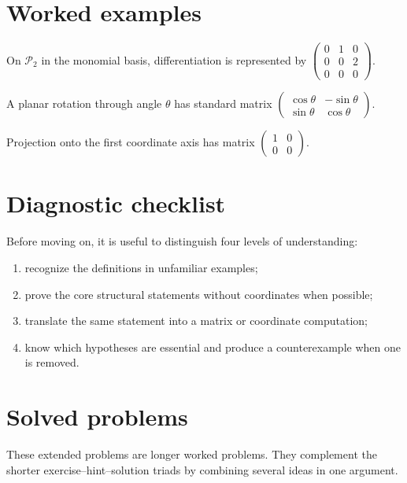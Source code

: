 \section{Worked examples}

\begin{example}\label{ex:i07-worked-01}
On $\mathcal P_2$ in the monomial basis, differentiation is represented by $\begin{pmatrix}0&1&0\\0&0&2\\0&0&0\end{pmatrix}$.
\end{example}

\begin{example}[Rotation]\label{ex:i07-worked-02}
A planar rotation through angle $\theta$ has standard matrix $\begin{pmatrix}\cos\theta&-\sin\theta\\\sin\theta&\cos\theta\end{pmatrix}$.
\end{example}

\begin{example}[Projection]\label{ex:i07-worked-03}
Projection onto the first coordinate axis has matrix $\begin{pmatrix}1&0\\0&0\end{pmatrix}$.
\end{example}

\section{Diagnostic checklist}
Before moving on, it is useful to distinguish four levels of understanding:
\begin{enumerate}
\item recognize the definitions in unfamiliar examples;
\item prove the core structural statements without coordinates when possible;
\item translate the same statement into a matrix or coordinate computation;
\item know which hypotheses are essential and produce a counterexample when one is removed.
\end{enumerate}

\section{Solved problems}
These extended problems are longer worked problems. They complement the shorter exercise--hint--solution triads by combining several ideas in one argument.


